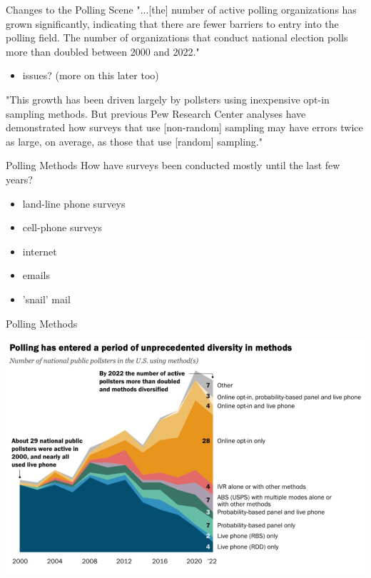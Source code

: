 \documentclass{beamer}
\begin{document}
\begin{frame}{Changes to the Polling Scene}
"...[the] number of active polling organizations has grown significantly, indicating that there are fewer barriers to entry into the polling field. The number of organizations that conduct national election polls more than doubled between 2000 and 2022."
\begin{itemize}
    \item issues? (more on this later too)
\end{itemize}\vspace{6mm}

"This growth has been driven largely by pollsters using inexpensive opt-in sampling methods. But previous Pew Research Center analyses have demonstrated how surveys that use [non-random] sampling may have errors twice as large, on average, as those that use [random] sampling."
\end{frame}

\begin{frame}{Polling Methods}
How have surveys been conducted mostly until the last few years?
\begin{itemize}
    \item land-line phone surveys
    \item cell-phone surveys
    \item internet
    \item emails
    \item 'snail' mail
\end{itemize}
\end{frame}

\begin{frame}{Polling Methods}
\begin{center}
    \includegraphics[scale=.7]{img/polling_methods.jpg}
\end{center}    
\end{frame}
\end{document}
